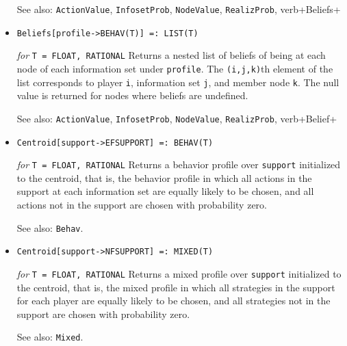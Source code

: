 \begin{itemize}
{\it for} {\tt T = FLOAT, RATIONAL}
\bd
Returns the probability of being at \verb+node+, conditional on the
player who chooses at \verb+node+ knowing she is in \verb+node+'s
information set, assuming all players follow \verb+profile+.  The null
value is returned if the belief value is not well-defined, or if
\verb+node+ is terminal.  It is an error if \verb+profile+ and \verb+node+
are not from the same extensive form game.
\item [See also:] \verb+ActionValue+, \verb+InfosetProb+, \verb+NodeValue+,
\verb+RealizProb+, verb+Beliefs+
\ed

\item{}
\protect \large \begin{verbatim}
Beliefs[profile->BEHAV(T)] =: LIST(T)
\end{verbatim}\normalsize

{\it for} {\tt T = FLOAT, RATIONAL} 
\bd 
Returns a nested list of
beliefs of being at each node of each information set under
\verb+profile+. The \verb+(i,j,k)+th element of the list corresponds
to player \verb+i+, information set \verb+j+, and member node
\verb+k+. The null value is returned for nodes where beliefs are
undefined.

\item [See also:] \verb+ActionValue+, \verb+InfosetProb+, \verb+NodeValue+,
\verb+RealizProb+, verb+Belief+
\ed




\item{}
\protect \large \begin{verbatim} 
Centroid[support->EFSUPPORT] =: BEHAV(T)
\end{verbatim}\normalsize

{\it for} {\tt T = FLOAT, RATIONAL}
\bd
Returns a behavior profile over \verb+support+ initialized to the
centroid, that is, the behavior profile in which all actions in the
support at each information set are equally likely to be chosen, and
all actions not in the support are chosen with probability zero.
\item [See also:] \verb+Behav+.
\ed

\item{}
\protect \large \begin{verbatim}
Centroid[support->NFSUPPORT] =: MIXED(T)
\end{verbatim}\normalsize

{\it for} {\tt T = FLOAT, RATIONAL}
\bd
Returns a mixed profile over \verb+support+
initialized to the centroid, that is, the mixed profile in which 
all strategies in the support for each player are equally likely to be
chosen, and all strategies not in the support are chosen with probability
zero.
\item [See also:] \verb+Mixed+.
\ed


\end{itemize}
